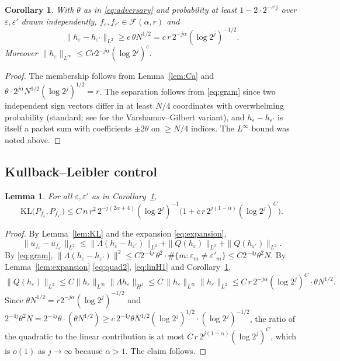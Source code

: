 \documentclass[11pt]{amsart}
\newtheorem{lemma}[theorem]{Lemma}
\newtheorem{corollary}[theorem]{Corollary}
\newcommand{\1}{\mathbf{1}}
\newcommand{\F}{\mathcal{F}}
\newcommand{\KL}{\mathrm{KL}}
\begin{document}
\begin{corollary}\label{cor:admissible}
With $\theta$ as in \eqref{eq:adversary} and probability at least
$1-2\cdot2^{-c'j}$ over $\varepsilon,\varepsilon'$ drawn independently,
$f_\varepsilon,f_{\varepsilon'}\in\F(\alpha,r)$ and
\[
\|h_\varepsilon-h_{\varepsilon'}\|_{L^2}\ge c\,\theta N^{1/2}
=c\,r\,2^{-j\alpha}(\log 2^j)^{-1/2}.
\]
Moreover $\|h_\varepsilon\|_{L^\infty}\le Cr2^{-j\alpha}(\log 2^j)^{c}$.
\end{corollary}

\begin{proof}
The membership follows from Lemma~\ref{lem:Ca} and
$\theta\cdot 2^{j\alpha}N^{1/2}(\log2^j)^{1/2}=r$. The separation follows
from \eqref{eq:gram} since two independent sign vectors differ in at least
$N/4$ coordinates with overwhelming probability (standard; see
\cite[Lemma~2.9]{Tsy09} for the Varshamov--Gilbert variant), and
$h_\varepsilon-h_{\varepsilon'}$ is itself a packet sum with coefficients
$\pm2\theta$ on $\ge N/4$ indices. The $L^\infty$ bound was noted above.
\end{proof}

\subsection{Kullback--Leibler control}

\begin{lemma}\label{lem:KLlow}
For all $\varepsilon,\varepsilon'$ as in Corollary~\ref{cor:admissible},
\[
\KL\big(P_{f_\varepsilon},P_{f_{\varepsilon'}}\big)
\le C\,n\,r^2\,2^{-j(2\alpha+4)}(\log2^j)^{-1}
\Big(1+c\,r\,2^{j(1-\alpha)}(\log 2^j)^{C}\Big).
\]
\end{lemma}

\begin{proof}
By Lemma~\ref{lem:KL} and the expansion \eqref{eq:expansion},
\[
\|u_{f_\varepsilon}-u_{f_{\varepsilon'}}\|_{L^2}
\le\|\Lambda(h_\varepsilon-h_{\varepsilon'})\|_{L^2}
+\|Q(h_\varepsilon)\|_{L^2}+\|Q(h_{\varepsilon'})\|_{L^2}.
\]
By \eqref{eq:gram},
$\|\Lambda(h_\varepsilon-h_{\varepsilon'})\|^2
\le C2^{-4j}\,\theta^2\cdot\#\{m:\varepsilon_m\ne\varepsilon'_m\}
\le C2^{-4j}\theta^2N$. By Lemma~\ref{lem:expansion} \eqref{eq:quad2},
\eqref{eq:linH1} and Corollary~\ref{cor:admissible},
\[
\|Q(h_\varepsilon)\|_{L^2}\le
C\|h_\varepsilon\|_{L^\infty}\|\Lambda h_\varepsilon\|_{H^1}
\le C\,\|h_\varepsilon\|_{L^\infty}\|h_\varepsilon\|_{L^2}
\le C\,r\,2^{-j\alpha}(\log2^j)^{C}\cdot\theta N^{1/2}.
\]
Since $\theta N^{1/2}=r2^{-j\alpha}(\log2^j)^{-1/2}$ and
$2^{-4j}\theta^2N=2^{-4j}\theta\cdot(\theta N^{1/2})
\ge c\,2^{-4j}\theta N^{1/2}(\log 2^j)^{1/2}\cdot(\log 2^j)^{-1/2}$,
the ratio of the quadratic to the linear contribution is at most
$C\,r\,2^{j(1-\alpha)}(\log 2^j)^{C}$, which is $o(1)$ as $j\to\infty$
because $\alpha>1$. The claim follows.
\end{proof}
\end{document}
